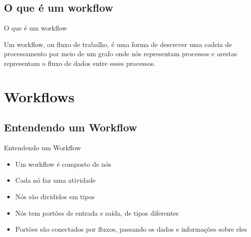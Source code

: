 \documentclass{beamer}
\begin{document}
\subsection{O que é um workflow}
\begin{frame}{O que é um workflow}
\begin{outline}
Um workflow, ou fluxo de trabalho, é uma forma de descrever uma cadeia de processamento por meio de um grafo onde nós representam processos e arestas representam o fluxo de dados entre esses processos.
\vfill

\end{outline}
\end{frame}


\section{Workflows}

\subsection{Entendendo um Workflow}
\begin{frame}{Entendendo um Workflow}
\begin{itemize}
    \item Um workflow é composto de nós
    \item Cada nó faz uma atividade
    \item Nós são divididos em tipos
    \item Nós tem portões de entrada e saída, de tipos diferentes
    \item Portões são conectados por fluxos, passando os dados e informações sobre eles
\end{itemize}
\vfill

\end{frame} 
\end{document}
